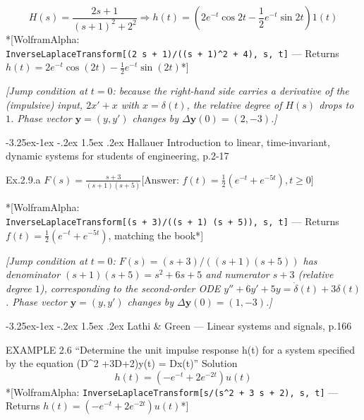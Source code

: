 \documentclass[
  11pt,
]{article}
\makeatletter
\providecommand{\implies}{\Longrightarrow}
\renewcommand\paragraph{\@startsection{paragraph}{4}{\z@}%
                                     {-3.25ex\@plus -1ex \@minus -.2ex}%
                                     {1.5ex \@plus .2ex}%
                                     {\normalfont\normalsize\bfseries}}
\makeatother
\begin{document}
\[ 
H(s) = \frac{2s + 1}{(s+1)^2 + 2^2} \implies h(t) = \left( 2e^{-t} \cos 2t - \frac{1}{2}e^{-t} \sin 2t \right) 1(t)
\] *{[}WolframAlpha:
\texttt{InverseLaplaceTransform{[}(2\ s\ +\ 1)/((s\ +\ 1)\^{}2\ +\ 4),\ s,\ t{]}}
--- Returns
\(h(t) = 2 e^{-t} \cos(2t) - \frac{1}{2} e^{-t} \sin(2t)\)*{]}

\emph{{[}Jump condition at \(t=0\): because the right-hand side carries
a derivative of the (impulsive) input, \(2x'+x\) with \(x=\delta(t)\),
the relative degree of \(H(s)\) drops to \(1\). Phase vector
\(\mathbf y=(y,y')\) changes by \(\Delta\mathbf y(0)=(2,-3)\).{]}}

\hypertarget{hallauer-introduction-to-linear-time-invariant-dynamic-systems-for-students-of-engineering-p.2-17}{%
\paragraph{Hallauer Introduction to linear, time-invariant, dynamic
systems for students of engineering,
p.2-17}\label{hallauer-introduction-to-linear-time-invariant-dynamic-systems-for-students-of-engineering-p.2-17}}

Ex.2.9.a
\(F(s) = \frac{s+3}{(s+1)(s+5)} \text{[Answer: } f(t) = \frac{1}{2} \left( e^{-t} + e^{-5t} \right), t \geq 0 \text{]}\)

*{[}WolframAlpha:
\texttt{InverseLaplaceTransform{[}(s\ +\ 3)/((s\ +\ 1)\ (s\ +\ 5)),\ s,\ t{]}}
--- Returns \(f(t) = \frac12\left(e^{-t} + e^{-5t}\right)\), matching
the book*{]}

\emph{{[}Jump condition at \(t=0\): \(F(s)=(s+3)/((s+1)(s+5))\) has
denominator \((s+1)(s+5)=s^2+6s+5\) and numerator \(s+3\) (relative
degree \(1\)), corresponding to the second-order ODE
\(y''+6y'+5y=\dot\delta(t)+3\delta(t)\). Phase vector
\(\mathbf y=(y,y')\) changes by \(\Delta\mathbf y(0)=(1,-3)\).{]}}

\hypertarget{lathi-green-linear-systems-and-signals-p.166}{%
\paragraph{Lathi \& Green --- Linear systems and signals,
p.166}\label{lathi-green-linear-systems-and-signals-p.166}}

EXAMPLE 2.6 ``Determine the unit impulse response h(t) for a system
specified by the equation (D\^{}2 +3D+2)y(t) = Dx(t)'' Solution
\[ h(t) = (-e^{-t} + 2e^{-2t})u(t) \] *{[}WolframAlpha:
\texttt{InverseLaplaceTransform{[}s/(s\^{}2\ +\ 3\ s\ +\ 2),\ s,\ t{]}}
--- Returns \(h(t) = \left(-e^{-t} + 2 e^{-2t}\right) u(t)\)*{]}
\end{document}
